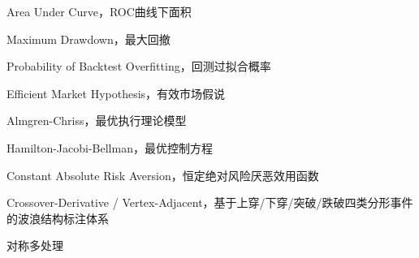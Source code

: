\item[AUC] Area Under Curve，ROC曲线下面积
\item[MDD] Maximum Drawdown，最大回撤
\item[PBO] Probability of Backtest Overfitting，回测过拟合概率
\item[EMH] Efficient Market Hypothesis，有效市场假说
\item[AC] Almgren-Chriss，最优执行理论模型
\item[HJB] Hamilton-Jacobi-Bellman，最优控制方程
\item[CARA] Constant Absolute Risk Aversion，恒定绝对风险厌恶效用函数
\item[CDVA] Crossover-Derivative / Vertex-Adjacent，基于上穿/下穿/突破/跌破四类分形事件的波浪结构标注体系
\item[SMP] 对称多处理

